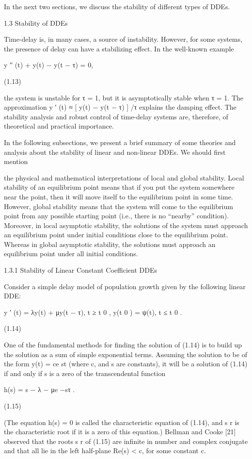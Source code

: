 \documentclass[12pt]{article}
\begin{document}
In the next two sections, we discuss the stability of different types of DDEs.

1.3 Stability of DDEs

Time-delay is, in many cases, a source of instability. However, for some systems, the presence of delay can have a stabilizing effect. In the 
well-known example

y ′′ (t) + y(t) − y(t − τ) = 0,

(1.13)

the system is unstable for τ = 1, but it is asymptotically stable when τ = 1. The approximation y ′ (t) ≈ [ y(t) − y(t − τ) ] /τ explains 
the damping effect. The stability analysis and robust control of time-delay systems are, therefore, of theoretical and practical importance.

In the following subsections, we present a brief summary of some theories and analysis about the stability of linear and non-linear DDEs. We 
should first mention

the physical and mathematical interpretations of local and global stability. Local stability of an equilibrium point means that if you put 
the system somewhere near the point, then it will move itself to the equilibrium point in some time. However, global stability means that the 
system will come to the equilibrium point from any possible starting point (i.e., there is no “nearby” condition). Moreover, in local 
asymptotic stability, the solutions of the system must approach an equilibrium point under initial conditions close to the equilibrium point. 
Whereas in global asymptotic stability, the solutions must approach an equilibrium point under all initial conditions.

1.3.1 Stability of Linear Constant Coefficient DDEs

Consider a simple delay model of population growth given by the following linear DDE:

y ′ (t) = λy(t) + μy(t − τ), t ≥ t 0 , y(t 0 ) = ψ(t), t ≤ t 0 .

(1.14)

One of the fundamental methods for finding the solution of (1.14) is to build up the solution as a sum of simple exponential terms. Assuming 
the solution to be of the form y(t) = ce st (where c, and s are constants), it will be a solution of (1.14) if and only if s is a zero of the 
transcendental function

h(s) = s − λ − μe −sτ .

(1.15)

(The equation h(s) = 0 is called the characteristic equation of (1.14), and s r is the characteristic root if it is a zero of this equation.) 
Bellman and Cooke [21] observed that the roots s r of (1.15) are infinite in number and complex conjugate and that all lie in the left 
half-plane Re(s) < c, for some constant c.
\end{document}
